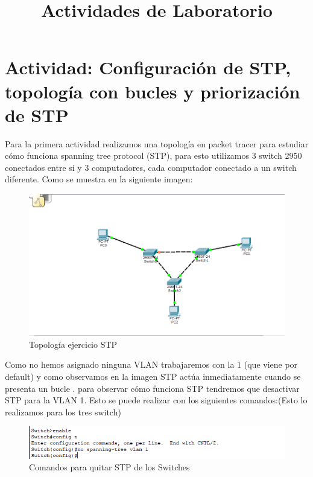 \documentclass[onecolumn,11pts]{IEEEtran}
\begin{document}
\cleardoublepage

\cleardoublepage
\listoffigures
\title{Actividades de Laboratorio}

\maketitle

\section{Actividad: Configuración de STP, topología con bucles y priorización de STP}
    Para la primera actividad realizamos una topología en packet tracer para estudiar cómo funciona spanning tree protocol (STP), para esto utilizamos 3 switch 2950  conectados entre si y 3 computadores, cada computador conectado a un switch diferente. Como se muestra en la siguiente imagen:
    
   \begin{figure}[h!]
\centering
 \includegraphics[scale=0.5]{topo1}
\caption{Topología ejercicio STP}
\label{fig:topo1}
\end{figure}

Como no hemos asignado ninguna VLAN trabajaremos con la 1 (que viene por default) y como observamos en la imagen STP actúa inmediatamente cuando se presenta un bucle . para observar cómo funciona STP tendremos que desactivar STP para la VLAN 1. Esto se puede realizar con los siguientes comandos:(Esto lo  realizamos para los tres switch)\\

\begin{figure}[h!]
\centering
 \includegraphics[scale=0.8]{comand-nostp}
\caption{Comandos para quitar STP de los Switches}
\label{fig:comand-nostp}
\end{figure}
\end{document}

